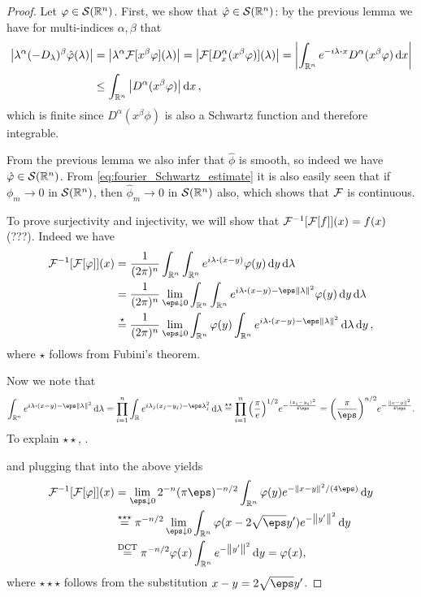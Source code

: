 \begin{proof}
	Let $\varphi \in \mathcal S(\mathbb R^n)$. First, we show that $\hat{\varphi} \in \mathcal S(\mathbb R^n)$: by the previous lemma we have for multi-indices $\alpha, \beta$ that
	\begin{align}
		\abs{\lambda^\alpha (-D_\lambda)^\beta \hat\phi(\lambda)} &= \abs{\lambda^\alpha \FF[x^\beta\phi](\lambda)} = \abs{\FF[D^\alpha_x (x^\beta\phi)](\lambda)} = \abs{\int_{\RR^n} e^{-i\lambda \vdot x} D^\alpha(x^\beta\phi) \dd{x}} \nonumber \\
		&\leq \int_{\RR^n} \abs{D^\alpha (x^\beta\phi)} \dd{x} \label{eq:fourier_Schwartz_estimate},
	\end{align}
which is finite since $D^\alpha (x^\beta\phi)$ is also a Schwartz function and therefore integrable. 

From the previous lemma we also infer that $\hat\phi$ is smooth, so indeed we have $\hat{\varphi} \in \mathcal S(\mathbb R^n)$. 
From \cref{eq:fourier_Schwartz_estimate} it is also easily seen that if $\phi_m \to 0$ in $\mathcal S(\mathbb R^n)$, then $\hat\phi_m \to 0$ in $\mathcal S(\mathbb R^n)$ also, which shows that $\mathcal F$ is continuous. 

To prove surjectivity and injectivity, we will show that $\mathcal F^{-1}[\mathcal F[f]](x) = f(x)$ (???). Indeed we have
\begin{align*}
	\FF^{-1} [\FF[\phi]](x) &= \frac{1}{(2\pi)^n} \int_{\RR^n} \int_{\RR^n} e^{i\lambda \vdot (x-y)} \phi(y) \dd{y}\dd{\lambda} \\
	&= \frac{1}{(2\pi)^n} \lim_{\eps \downarrow 0} \int_{\RR^n} \int_{\RR^n} e^{i \lambda \vdot ( x- y) - \eps\norm{\lambda}^2} \phi(y) \dd{y}\dd{\lambda} \\
	&\overset\star= \frac{1}{(2\pi)^n}\lim_{\eps \downarrow 0} \int_{\RR^n} \phi(y)\int_{\RR^n} e^{i\lambda \vdot (x- y) - \eps\norm{\lambda}^2} \dd{\lambda} \dd{y},
\end{align*}
where $\star$ follows from Fubini's theorem. 

Now we note that 
\[
\int_{\RR^n} e^{i\lambda\vdot (x-y) - \eps\norm{\lambda}^2} \dd{\lambda} = \prod_{i=1}^n \int_{\RR} e^{i\lambda_j(x_j - y_j) - \eps\lambda_j^2} \dd{\lambda} \overset{\star\star}= \prod_{i=1}^n \qty(\frac\pi e)^{1/2} e^{- \frac{(x_i - y_i)^2}{4\eps}} = \qty(\frac\pi\eps)^{n/2} e^{- \frac{\norm{x - y}^2}{4\eps}}.
\] 
To explain $\star\star$, \TODO. 


and plugging that into the above yields 
\begin{align*}
\FF^{-1}[\FF[\phi]](x) &= \lim_{\eps\downarrow 0} 2^{-n}(\pi \eps)^{-n/2} \int_{\RR^n} \phi(y) e^{-\norm{x-y}^2/(4\eps)} \dd{y} \\
&\overset{\star\star\star}= \pi^{-n/2} \lim_{\eps\downarrow0}\int_{\RR^n} \phi(x - 2\sqrt\eps y') e^{-\norm{y'}^2} \dd{y} \\
&\overset{\text{DCT}}=\pi^{-n/2} \phi(x) \int_{\RR^n} e^{-\norm{y'}^2} \dd{y} = \phi(x),
\end{align*}
where $\star\star\star$ follows from the substitution $x - y = 2\sqrt\eps y'$.


\end{proof}
